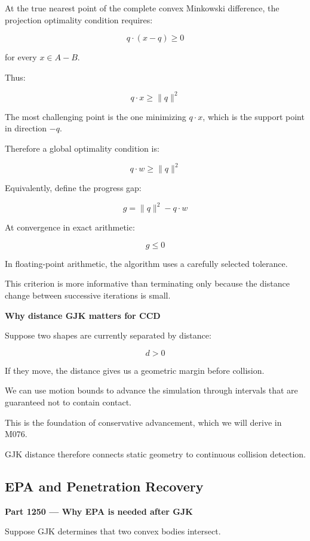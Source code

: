 At the true nearest point of the complete convex Minkowski difference, the projection optimality condition requires:

\[
q\cdot(x-q)\ge0
\]

for every \(x\in A-B\).

Thus:

\[
q\cdot x\ge\|q\|^2
\]

The most challenging point is the one minimizing \(q\cdot x\), which is the support point in direction \(-q\).

Therefore a global optimality condition is:

\[
\boxed{ q\cdot w\ge\|q\|^2 }
\]

Equivalently, define the progress gap:

\[
\boxed{ g=\|q\|^2-q\cdot w }
\]

At convergence in exact arithmetic:

\[
g\le0
\]

In floating-point arithmetic, the algorithm uses a carefully selected tolerance.

This criterion is more informative than terminating only because the distance change between successive iterations is small.

\textbf{Why distance GJK matters for CCD}

Suppose two shapes are currently separated by distance:

\[
d>0
\]

If they move, the distance gives us a geometric margin before collision.

We can use motion bounds to advance the simulation through intervals that are guaranteed not to contain contact.

This is the foundation of conservative advancement, which we will derive in M076.

GJK distance therefore connects static geometry to continuous collision detection.

\subsection{EPA and Penetration Recovery}\label{04-visual-computing-ii-ch025-epa-and-penetration-recovery}

\hypertarget{04-visual-computing-ii-ch025-epa-and-penetration-recovery}{}

\textbf{Part 1250 --- Why EPA is needed after GJK}

Suppose GJK determines that two convex bodies intersect.

